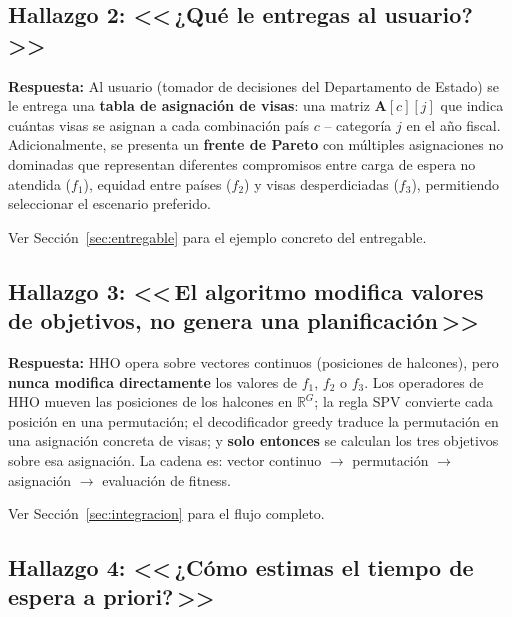 \documentclass[12pt,letterpaper]{article}
\begin{document}
\subsection{\texorpdfstring{Hallazgo 2: <<\,¿Qué le entregas al usuario?\,>>}{Hallazgo 2: ¿Qué le entregas al usuario?}}

\begin{answerbox}
\textbf{Respuesta:} Al usuario (tomador de decisiones del Departamento de Estado) se le entrega una \textbf{tabla de asignación de visas}: una matriz $\mathbf{A}[c][j]$ que indica cuántas visas se asignan a cada combinación país $c$ -- categoría $j$ en el año fiscal. Adicionalmente, se presenta un \textbf{frente de Pareto} con múltiples asignaciones no dominadas que representan diferentes compromisos entre carga de espera no atendida ($f_1$), equidad entre países ($f_2$) y visas desperdiciadas ($f_3$), permitiendo seleccionar el escenario preferido.

Ver Sección~\ref{sec:entregable} para el ejemplo concreto del entregable.
\end{answerbox}

\subsection{\texorpdfstring{Hallazgo 3: <<\,El algoritmo modifica valores de objetivos, no genera una planificación\,>>}{Hallazgo 3: El algoritmo modifica valores de objetivos, no genera una planificación}}

\begin{answerbox}
\textbf{Respuesta:} HHO opera sobre vectores continuos (posiciones de halcones), pero \textbf{nunca modifica directamente} los valores de $f_1$, $f_2$ o $f_3$. Los operadores de HHO mueven las posiciones de los halcones en $\mathbb{R}^G$; la regla SPV convierte cada posición en una permutación; el decodificador greedy traduce la permutación en una asignación concreta de visas; y \textbf{solo entonces} se calculan los tres objetivos sobre esa asignación. La cadena es: vector continuo $\rightarrow$ permutación $\rightarrow$ asignación $\rightarrow$ evaluación de fitness.

Ver Sección~\ref{sec:integracion} para el flujo completo.
\end{answerbox}

\subsection{\texorpdfstring{Hallazgo 4: <<\,¿Cómo estimas el tiempo de espera a priori?\,>>}{Hallazgo 4: ¿Cómo estimas el tiempo de espera a priori?}}
\end{document}
